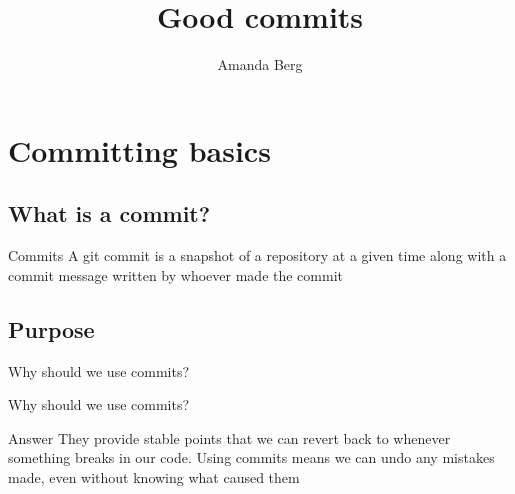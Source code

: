 \title{%
  Good commits
}
\author{Amanda Berg}


\mode*


\section{Committing basics}

\subsection{What is a commit?}

\begin{frame}
    \begin{block}{Commits}
    A git commit is a snapshot of a repository at a given time along with a commit message written by whoever made the commit
    \end{block} 
\end{frame}


\subsection{Purpose}
\begin{frame}
\begin{question}
    Why should we use commits?
\end{question}
    
\end{frame}


\begin{frame}
  \begin{question}
    Why should we use commits?
  \end{question}
  \begin{block}{Answer}
    They provide stable points that we can revert back to whenever something breaks in our code. Using commits means we can undo any mistakes made, even without knowing what caused them
  \end{block}
\end{frame}

